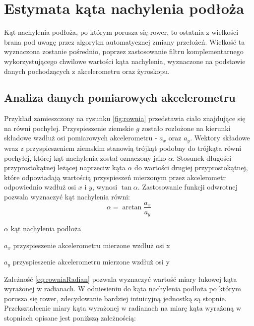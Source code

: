 \section{Estymata kąta nachylenia podłoża}
Kąt nachylenia podłoża, po którym porusza się rower, to ostatnia z wielkości  brana pod uwagę przez algorytm automatycznej zmiany przełożeń. Wielkość ta wyznaczona zostanie pośrednio, poprzez zastosowanie filtru komplementarnego wykorzystującego chwilowe wartości kąta nachylenia, wyznaczone na podstawie danych pochodzących z akcelerometru oraz żyroskopu.

\subsection{Analiza danych pomiarowych akcelerometru}
\label{pomiaryAkcel}
Przykład zamieszczony na rysunku \ref{fig:rownia} przedstawia ciało znajdujące się na równi pochyłej. Przyspieszenie ziemskie \textit{$g$} zostało rozłożone na kierunki składowe wzdłuż osi pomiarowych akcelerometru - \textit{$a_x$} oraz \textit{$a_y$}. Wektory składowe wraz z przyspieszeniem ziemskim stanowią trójkąt podobny do trójkąta równi pochyłej, której kąt nachylenia został oznaczony jako $\alpha$. Stosunek długości przyprostokątnej leżącej naprzeciw kąta $\alpha$ do wartości drugiej przyprostokątnej, które odpowiadają wartością przyspieszeń mierzonym przez akcelerometr odpowiednio wzdłuż osi $x$ i $y$, wynosi $\tan{\alpha}$. Zastosowanie funkcji odwrotnej pozwala wyznaczyć kąt nachylenia równi:
\begin{equation}
    \alpha=\arctan{\frac{a_x}{a_y}}
    \label{eq:rowniaRadian}
\end{equation}
\begin{eqwhere}[2cm]
	\item[$\alpha$] kąt nachylenia podłoża
	\item[$a_x$] przyspieszenie akcelerometru mierzone wzdłuż osi x
	\item[$a_y$] przyspieszenie akcelerometru mierzone wzdłuż osi y
\end{eqwhere}
Zależność \ref{eq:rowniaRadian} pozwala wyznaczyć wartość miary łukowej kąta wyrażonej w radianach. W odniesieniu do kąta nachylenia podłoża po którym porusza się rower, zdecydowanie bardziej intuicyjną jednostką są stopnie. Przekształcenie miary kąta wyrażonej w radianach na miarę kąta wyrażoną w stopniach opisane jest poniższą zależnością:
